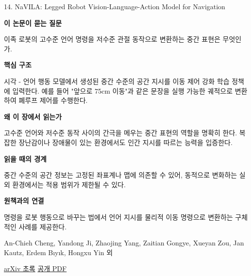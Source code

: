 \documentclass[11pt,openany]{book}
\begin{document}
\begin{termcard}{14. NaVILA: Legged Robot Vision-Language-Action Model for Navigation}

\par

\medskip

{\sffamily\bfseries\color{deepblue} 이 논문이 묻는 질문}\par

이족 로봇의 고수준 언어 명령을 저수준 관절 동작으로 변환하는 중간 표현은 무엇인가.

\smallskip

{\sffamily\bfseries\color{deepblue} 핵심 구조}\par

시각 - 언어 행동 모델에서 생성된 중간 수준의 공간 지시를 이동 제어 강화 학습 정책에 입력한다. 예를 들어 "앞으로 75cm 이동"과 같은 문장을 실행 가능한 궤적으로 변환하여 폐루프 제어를 수행한다.

\smallskip

{\sffamily\bfseries\color{deepblue} 왜 이 장에서 읽는가}\par

고수준 언어와 저수준 동작 사이의 간극을 메우는 중간 표현의 역할을 명확히 한다. 복잡한 장난감이나 장애물이 있는 환경에서도 인간 지시를 따르는 능력을 입증한다.

\smallskip

{\sffamily\bfseries\color{coral} 읽을 때의 경계}\par

중간 수준의 공간 정보는 고정된 좌표계나 맵에 의존할 수 있어, 동적으로 변화하는 실외 환경에서는 적용 범위가 제한될 수 있다.

\smallskip

{\sffamily\bfseries\color{teal} 원책과의 연결}\par

명령을 로봇 행동으로 바꾸는 법에서 언어 지시를 물리적 이동 명령으로 변환하는 구체적인 사례를 제공한다.

\medskip

{\footnotesize\color{muted} An-Chieh Cheng, Yandong Ji, Zhaojing Yang, Zaitian Gongye, Xueyan Zou, Jan Kautz, Erdem Bıyık, Hongxu Yin 외\par

\href{https://arxiv.org/abs/2412.04453}{arXiv 초록} \quad \href{https://arxiv.org/pdf/2412.04453}{공개 PDF}\par}

\end{termcard}
\end{document}
